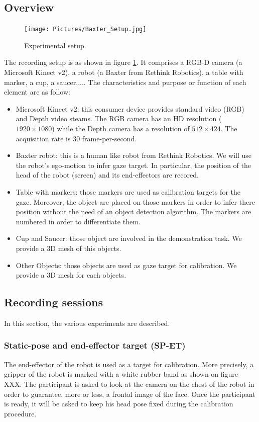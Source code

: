 \documentclass[11pt,a4paper]{article}
\begin{document}
\subsection{Overview}
\label{Overview}
\begin{figure}[!ht]
\begin{center}
\texttt{[image: Pictures/Baxter\_Setup.jpg]}
\end{center}
\caption{Experimental setup. \label{Experimental_Setup}}
\end{figure}
The recording setup is as shown in figure \ref{Experimental_Setup}. It comprises a RGB-D camera (a Microsoft Kinect v2), a robot (a Baxter from Rethink Robotics), a table with marker, a cup, a saucer,.... The characteristics and purpose or function of each element are as follow:
\begin{itemize}
\item Microsoft Kinect v2: this consumer device provides standard video (RGB) and Depth video steams. The RGB camera has an HD resolution ($1920 \times 1080$) while the Depth camera has a resolution of $512 \times 424$. The acquisition rate is 30 frame-per-second.
\item Baxter robot: this is a human like robot from Rethink Robotics. We will use the robot's ego-motion to infer gaze target. In particular, the position of the head of the robot (screen) and its end-effectors are recored.
\item Table with markers: those markers are used as calibration targets for the gaze. Moreover, the object are placed on those markers in order to infer there position without the need of an object detection algorithm. The markers are numbered in order to differentiate them.
\item Cup and Saucer: those object are involved in the demonstration task. We provide a 3D mesh of this objects.
\item Other Objects: those objects are used as gaze target for calibration. We provide a 3D mesh for each objects.
\end{itemize}

\subsection{Recording sessions}
In this section, the various experiments are described.
\subsubsection{Static-pose and end-effector target (SP-ET)}
The end-effector of the robot is used as a target for calibration. More precisely, a gripper of the robot is marked with a white rubber band as shown on figure XXX. The participant is asked to look at the camera on the chest of the robot in order to guarantee, more or less, a frontal image of the face. Once the participant is ready, it will be asked to keep his head pose fixed during the calibration procedure.
\end{document}
